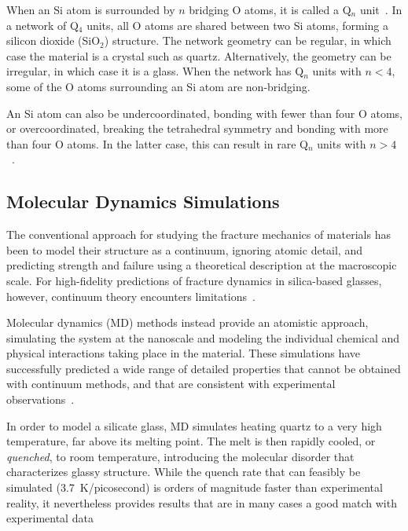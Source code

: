 When an Si atom is surrounded by $n$ bridging O atoms, it is called a Q$_n$ unit~\cite{shelby2005}. In a network of Q$_4$ units, all O atoms are shared between two Si atoms, forming a silicon dioxide (SiO$_2$) structure.  The network geometry can be regular, in which case the material is a crystal such as quartz.  Alternatively, the geometry can be irregular, in which case it is a glass.  When the network has Q$_n$ units with $n<4$, some of the O atoms surrounding an Si atom are non-bridging.

An Si atom can also be undercoordinated, bonding with fewer than four O atoms, or overcoordinated, breaking the tetrahedral symmetry and bonding with more than four O atoms.  In the latter case, this can result in rare Q$_n$ units with $n>4$~\cite{pedone2015dynamics}.

\subsection{Molecular Dynamics Simulations} 

The conventional approach for studying the fracture mechanics of materials has been to model their structure as a continuum, ignoring atomic detail, and predicting strength and failure using a theoretical description at the macroscopic scale.  For high-fidelity predictions of fracture dynamics in silica-based glasses, however, continuum theory encounters limitations~\cite{shimada2015breakdown}.

Molecular dynamics (MD) methods instead provide an atomistic approach, simulating the system at the nanoscale and modeling the individual chemical and physical interactions taking place in the material. These simulations have successfully predicted a wide range of detailed properties that cannot be obtained with continuum methods, and that are consistent with experimental observations~\cite{pedone2009properties}.

In order to model a silicate glass, MD simulates heating quartz to a very high temperature, far above its melting point.  The melt is then rapidly cooled, or \emph{quenched}, to room temperature, introducing the molecular disorder that characterizes glassy structure.  While the quench rate that can feasibly be simulated (3.7~K/picosecond) is orders of magnitude faster than experimental reality, it nevertheless provides results that are in many cases a good match with experimental data~\cite{markpres,mWilson_continuum_stress}


